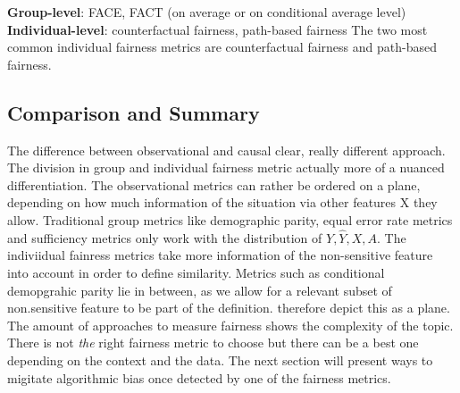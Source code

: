 \textbf{Group-level}: FACE, FACT (on average or on conditional average level) \parencite{Zafar2017PPNFC}\\
\textbf{Individual-level}: counterfactual fairness, path-based fairness \parencite{kusner} 
The two most common individual fairness metrics are counterfactual fairness and path-based fairness.


\subsection{Comparison and Summary}

The difference between observational and causal clear, really different approach. The division in group and individual fairness metric actually more of a nuanced differentiation. The observational metrics can rather be ordered on a plane, depending on how much information of the situation via other features X they allow.
Traditional group metrics like demographic parity, equal error rate metrics and sufficiency metrics only work with the distribution of $Y, \hat{Y}, X, A$. The indiviidual fainress metrics take more information of the non-sensitive feature into account in order to define similarity. Metrics such as conditional demopgrahic parity lie in between, as we allow for a relevant subset of non.sensitive feature to be part of the definition.
\cite{castelnovo2022} therefore depict this as a plane.
The amount of approaches to measure fairness shows the complexity of the topic. There is not \textit{the} right fairness metric to choose but there can be a best one depending on the context and the data. The next section will present ways to migitate algorithmic bias once detected by one of the fairness metrics.


